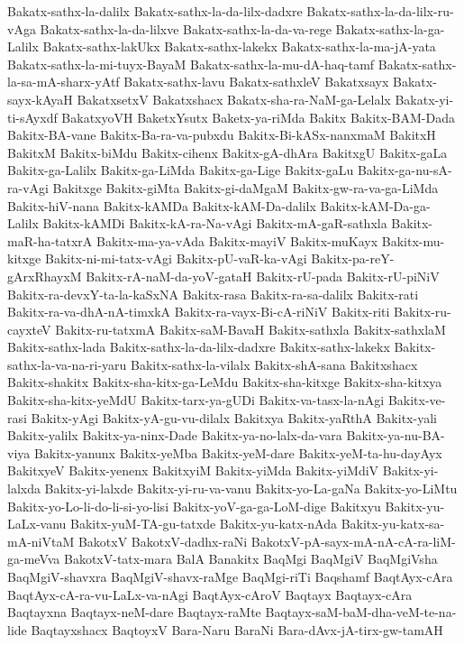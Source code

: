 {Bakatx-sathx-la-dalilx
Bakatx-sathx-la-da-lilx-dadxre
Bakatx-sathx-la-da-lilx-ru-vAga
Bakatx-sathx-la-da-lilxve
Bakatx-sathx-la-da-va-rege
Bakatx-sathx-la-ga-Lalilx
Bakatx-sathx-lakUkx
Bakatx-sathx-lakekx
Bakatx-sathx-la-ma-jA-yata
Bakatx-sathx-la-mi-tuyx-BayaM
Bakatx-sathx-la-mu-dA-haq-tamf
Bakatx-sathx-la-sa-mA-sharx-yAtf
Bakatx-sathx-lavu
Bakatx-sathxleV
Bakatxsayx
Bakatx-sayx-kAyaH
BakatxsetxV
Bakatxshacx
Bakatx-sha-ra-NaM-ga-Lelalx
Bakatx-yi-ti-sAyxdf
BakatxyoVH
BaketxYsutx
Baketx-ya-riMda
Bakitx
Bakitx-BAM-Dada
Bakitx-BA-vane
Bakitx-Ba-ra-va-pubxdu
Bakitx-Bi-kASx-nanxmaM
BakitxH
BakitxM
Bakitx-biMdu
Bakitx-cihenx
Bakitx-gA-dhAra
BakitxgU
Bakitx-gaLa
Bakitx-ga-Lalilx
Bakitx-ga-LiMda
Bakitx-ga-Lige
Bakitx-gaLu
Bakitx-ga-nu-sA-ra-vAgi
Bakitxge
Bakitx-giMta
Bakitx-gi-daMgaM
Bakitx-gw-ra-va-ga-LiMda
Bakitx-hiV-nana
Bakitx-kAMDa
Bakitx-kAM-Da-dalilx
Bakitx-kAM-Da-ga-Lalilx
Bakitx-kAMDi
Bakitx-kA-ra-Na-vAgi
Bakitx-mA-gaR-sathxla
Bakitx-maR-ha-tatxrA
Bakitx-ma-ya-vAda
Bakitx-mayiV
Bakitx-muKayx
Bakitx-mu-kitxge
Bakitx-ni-mi-tatx-vAgi
Bakitx-pU-vaR-ka-vAgi
Bakitx-pa-reY-gArxRhayxM
Bakitx-rA-naM-da-yoV-gataH
Bakitx-rU-pada
Bakitx-rU-piNiV
Bakitx-ra-devxY-ta-la-kaSxNA
Bakitx-rasa
Bakitx-ra-sa-dalilx
Bakitx-rati
Bakitx-ra-va-dhA-nA-timxkA
Bakitx-ra-vayx-Bi-cA-riNiV
Bakitx-riti
Bakitx-ru-cayxteV
Bakitx-ru-tatxmA
Bakitx-saM-BavaH
Bakitx-sathxla
Bakitx-sathxlaM
Bakitx-sathx-lada
Bakitx-sathx-la-da-lilx-dadxre
Bakitx-sathx-lakekx
Bakitx-sathx-la-va-na-ri-yaru
Bakitx-sathx-la-vilalx
Bakitx-shA-sana
Bakitxshacx
Bakitx-shakitx
Bakitx-sha-kitx-ga-LeMdu
Bakitx-sha-kitxge
Bakitx-sha-kitxya
Bakitx-sha-kitx-yeMdU
Bakitx-tarx-ya-gUDi
Bakitx-va-tasx-la-nAgi
Bakitx-ve-rasi
Bakitx-yAgi
Bakitx-yA-gu-vu-dilalx
Bakitxya
Bakitx-yaRthA
Bakitx-yali
Bakitx-yalilx
Bakitx-ya-ninx-Dade
Bakitx-ya-no-lalx-da-vara
Bakitx-ya-nu-BA-viya
Bakitx-yanunx
Bakitx-yeMba
Bakitx-yeM-dare
Bakitx-yeM-ta-hu-dayAyx
BakitxyeV
Bakitx-yenenx
BakitxyiM
Bakitx-yiMda
Bakitx-yiMdiV
Bakitx-yi-lalxda
Bakitx-yi-lalxde
Bakitx-yi-ru-va-vanu
Bakitx-yo-La-gaNa
Bakitx-yo-LiMtu
Bakitx-yo-Lo-li-do-li-si-yo-lisi
Bakitx-yoV-ga-ga-LoM-dige
Bakitxyu
Bakitx-yu-LaLx-vanu
Bakitx-yuM-TA-gu-tatxde
Bakitx-yu-katx-nAda
Bakitx-yu-katx-sa-mA-niVtaM
BakotxV
BakotxV-dadhx-raNi
BakotxV-pA-sayx-mA-nA-cA-ra-liM-ga-meVva
BakotxV-tatx-mara
BalA
Banakitx
BaqMgi
BaqMgiV
BaqMgiVsha
BaqMgiV-shavxra
BaqMgiV-shavx-raMge
BaqMgi-riTi
Baqshamf
BaqtAyx-cAra
BaqtAyx-cA-ra-vu-LaLx-va-nAgi
BaqtAyx-cAroV
Baqtayx
Baqtayx-cAra
Baqtayxna
Baqtayx-neM-dare
Baqtayx-raMte
Baqtayx-saM-baM-dha-veM-te-na-lide
Baqtayxshacx
BaqtoyxV
Bara-Naru
BaraNi
Bara-dAvx-jA-tirx-gw-tamAH
}
